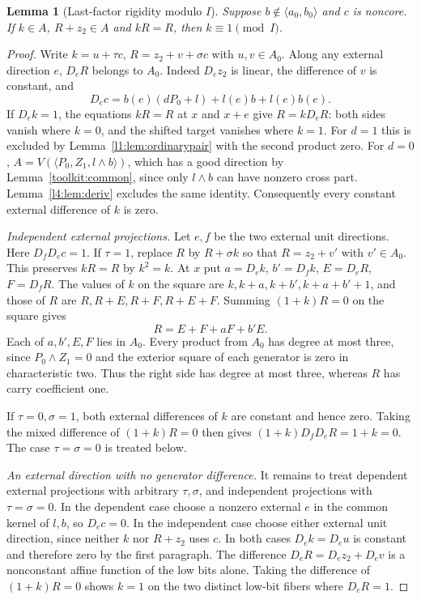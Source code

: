\documentclass[11pt,a4paper]{article}
\theoremstyle{plain}
\newtheorem{lemma}[theorem]{Lemma}
\theoremstyle{remark}
\theoremstyle{plain}
\begin{document}
\begin{lemma}[Last-factor rigidity modulo $I$]\label{l2:lem:lastfactor}
Suppose $b\notin\langle a_0,b_0\rangle$ and $c$ is noncore. If $k\in A$, $R+z_2\in A$ and $kR=R$, then $k\equiv1\pmod I$.
\end{lemma}
\begin{proof}
Write $k=u+\tau c$, $R=z_2+v+\sigma c$ with $u,v\in A_0$. Along any external direction $e$, $D_eR$ belongs to $A_0$. Indeed $D_ez_2$ is linear, the difference of $v$ is constant, and
\[
D_e c=b(e)(dP_0+l)+l(e)b+l(e)b(e).
\]
If $D_e k=1$, the equations $kR=R$ at $x$ and $x+e$ give $R=kD_eR$: both sides vanish where $k=0$, and the shifted target vanishes where $k=1$. For $d=1$ this is excluded by Lemma~\ref{l1:lem:ordinarypair} with the second product zero. For $d=0$, $A=V(\langle P_0,Z_1,l\wedge b\rangle)$, which has a good direction by Lemma~\ref{toolkit:common}, since only $l\wedge b$ can have nonzero cross part. Lemma~\ref{l4:lem:deriv} excludes the same identity. Consequently every constant external difference of $k$ is zero.

\emph{Independent external projections.}
Let $e,f$ be the two external unit directions. Here $D_fD_ec=1$. If $\tau=1$, replace $R$ by $R+\sigma k$ so that $R=z_2+v'$ with $v'\in A_0$. This preserves $kR=R$ by $k^2=k$. At $x$ put $a=D_e k$, $b'=D_fk$, $E=D_eR$, $F=D_fR$. The values of $k$ on the square are $k,k+a,k+b',k+a+b'+1$, and those of $R$ are $R,R+E,R+F,R+E+F$. Summing $(1+k)R=0$ on the square gives
\[
R=E+F+aF+b'E.
\]
Each of $a,b',E,F$ lies in $A_0$. Every product from $A_0$ has degree at most three, since $P_0\wedge Z_1=0$ and the exterior square of each generator is zero in characteristic two. Thus the right side has degree at most three, whereas $R$ has carry coefficient one.

If $\tau=0,\sigma=1$, both external differences of $k$ are constant and hence zero. Taking the mixed difference of $(1+k)R=0$ then gives $(1+k)D_fD_eR=1+k=0$. The case $\tau=\sigma=0$ is treated below.

\emph{An external direction with no generator difference.}
It remains to treat dependent external projections with arbitrary $\tau,\sigma$, and independent projections with $\tau=\sigma=0$. In the dependent case choose a nonzero external $e$ in the common kernel of $l,b$, so $D_ec=0$. In the independent case choose either external unit direction, since neither $k$ nor $R+z_2$ uses $c$. In both cases $D_e k=D_e u$ is constant and therefore zero by the first paragraph. The difference $D_eR=D_ez_2+D_ev$ is a nonconstant affine function of the low bits alone. Taking the difference of $(1+k)R=0$ shows $k=1$ on the two distinct low-bit fibers where $D_eR=1$.


\end{proof}
\end{document}
